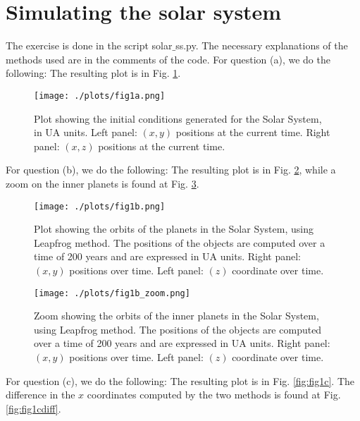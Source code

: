 \section{Simulating the solar system}
The exercise is done in the script solar$\_$ss.py. The necessary explanations of the methods used are in the comments of the code. 
For question (a), we do the following:  
The resulting plot is in Fig. \ref{fig:fig1a}.

\begin{figure}[h!]
    \centering
    \texttt{[image: ./plots/fig1a.png]}
    \caption{Plot showing the initial conditions generated for the Solar System, in UA units. Left panel: $(x,y)$ positions at the current time. Right panel: $(x,z)$ positions at the current time.}
    \label{fig:fig1a}
  \end{figure}

For question (b), 
we do the following: 
The resulting plot is in Fig. \ref{fig:fig1b}, while a zoom on the inner planets is found at Fig. \ref{fig:fig1bzoom}.

\begin{figure}[h!]
    \centering
    \texttt{[image: ./plots/fig1b.png]}
    \caption{Plot showing the orbits of the planets in the Solar System, using Leapfrog method.
    The positions of the objects are computed over a time of 200 years and are expressed in UA units. Right panel: $(x,y)$ positions over time. Left panel: $(z)$ coordinate over time.} 
    \label{fig:fig1b}
  \end{figure}

  \begin{figure}[h!]
    \centering
    \texttt{[image: ./plots/fig1b\_zoom.png]}
    \caption{Zoom showing the orbits of the inner planets in the Solar System, using Leapfrog method.
    The positions of the objects are computed over a time of 200 years and are expressed in UA units. Right panel: $(x,y)$ positions over time. Left panel: $(z)$ coordinate over time.} 
    \label{fig:fig1bzoom}
  \end{figure}

For question (c), 
we do the following: 
The resulting plot is in Fig. \ref{fig:fig1c}. The difference in the $x$ coordinates computed by the two methods is found at Fig. \ref{fig:fig1cdiff}.


